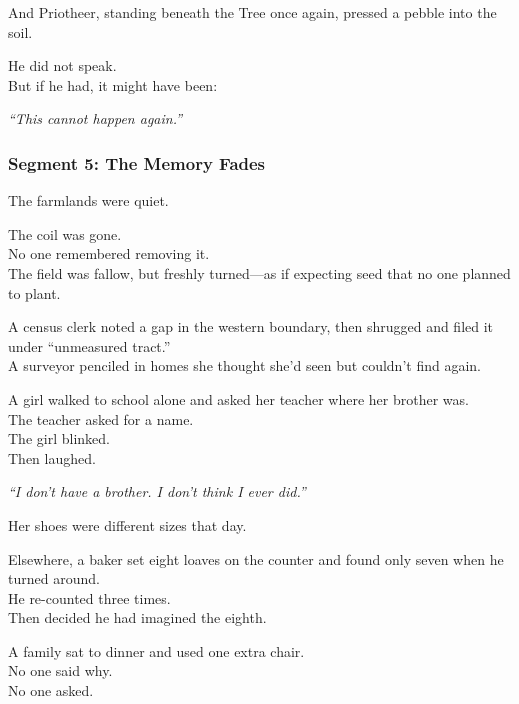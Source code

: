 \documentclass[9pt]{article}
\begin{document}
\vspace{0.5em}
And Priotheer, standing beneath the Tree once again, pressed a pebble into the soil.

\vspace{0.5em}
He did not speak.\\
But if he had, it might have been:

\vspace{0.5em}
\textit{``This cannot happen again.''}


\newpage

\subsubsection*{Segment 5: The Memory Fades}

The farmlands were quiet.

\vspace{0.5em}
The coil was gone.\\
No one remembered removing it.\\
The field was fallow, but freshly turned---as if expecting seed that no one planned to plant.

\vspace{0.5em}
A census clerk noted a gap in the western boundary, then shrugged and filed it under ``unmeasured tract.''\\
A surveyor penciled in homes she thought she’d seen but couldn’t find again.

\vspace{0.5em}
A girl walked to school alone and asked her teacher where her brother was.\\
The teacher asked for a name.\\
The girl blinked.\\
Then laughed.

\vspace{0.5em}
\textit{``I don’t have a brother. I don’t think I ever did.''}

\vspace{0.5em}
Her shoes were different sizes that day.

\vspace{0.5em}
Elsewhere, a baker set eight loaves on the counter and found only seven when he turned around.\\
He re-counted three times.\\
Then decided he had imagined the eighth.

\vspace{0.5em}
A family sat to dinner and used one extra chair.\\
No one said why.\\
No one asked.
\end{document}
